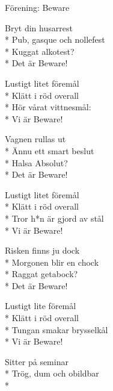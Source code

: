 \begin{SongText}[Vi är Beware!]
    \begin{SongInfo}
        Förening: Beware
    \end{SongInfo}
    \begin{SongVerse}
        Bryt din husarrest\\*%
        Pub, gasque och nollefest\\*%
        Kuggat alkotest?\\*%
        Det är Beware!
    \end{SongVerse}
    \begin{SongVerse}
        Lustigt litet föremål\\*%
        Klätt i röd overall\\*%
        Hör vårat vittnesmål:\\*%
        Vi är Beware!
    \end{SongVerse}
    \begin{SongVerse}
        Vagnen rullas ut\\*%
        Ännu ett smart beslut\\*%
        Halsa Absolut?\\*%
        Det är Beware!
    \end{SongVerse}
    \begin{SongVerse}
        Lustigt litet föremål\\*%
        Klätt i röd overall\\*%
        Tror h*n är gjord av stål\\*%
        Vi är Beware!
    \end{SongVerse}
    \begin{SongVerse}
        Risken finns ju dock\\*%
        Morgonen blir en chock\\*%
        Raggat getabock?\\*%
        Det är Beware!
    \end{SongVerse}
    \begin{SongVerse}
        Lustigt lite föremål\\*%
        Klätt i röd overall\\*%
        Tungan smakar brysselkål\\*%
        Vi är Beware!
    \end{SongVerse}
    \begin{SongVerse}
        Sitter på seminar\\*%
        Trög, dum och obildbar\\*%

\end{SongVerse}
\end{SongText}
